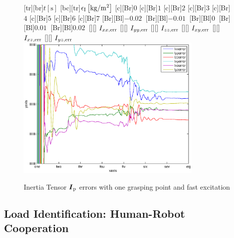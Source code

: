 \begin{figure}
	\centering	
	[tr][br]{$t\left[\mathrm{s}\right]$}
	[bc][tr]{$\epsilon_{\mathrm{I}}\left[\mathrm{kg}/\mathrm{m}^2\right]$}
	[Br]{$0$}
	[Br]{$1$}
	[Br]{$2$}
	[Br]{$3$}
	[Br]{$4$}
	[Br]{$5$}
	[Br]{$6$}
	[Br]{$7$}
	[Br][Bl]{$-0.02\  $}
	[Br][Bl]{$-0.01\ $}
	[Br][Bl]{$0\  $}
	[Br][Bl]{$0.01\  $}
	[Br][Bl]{$0.02\  $}
	[][]{\tiny \hspace{0.5cm} $I_{xx,\mathrm{err}}$}
	[][]{\tiny \hspace{0.5cm} $I_{yy,\mathrm{err}}$}
	[][]{\tiny \hspace{0.5cm} $I_{zz,\mathrm{err}}$}
	[][]{\tiny \hspace{0.5cm} $I_{xy,\mathrm{err}}$}
	[][]{\tiny \hspace{0.5cm} $I_{xz,\mathrm{err}}$}
	[][]{\tiny \hspace{0.5cm} $I_{yz,\mathrm{err}}$}
	\includegraphics[width=0.8\textwidth]{figures/one_grasping_point_fast_inertias.eps}
	\vspace{0.2cm}
	\caption[Inertia errors, one grasping point, fast excitation]{Inertia Tensor $\boldsymbol{I}_{\mathrm{p}}$ errors with one grasping point and fast excitation}
	\label{fig:estim_inertia_one_fast}
\end{figure}

\subsection{Load Identification: Human-Robot Cooperation}
